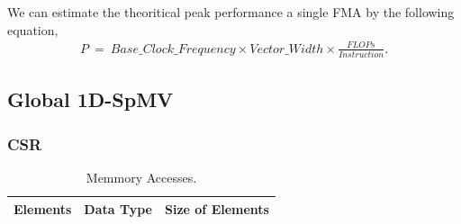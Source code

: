\documentclass[conference, 10ppt]{IEEEtran}
\begin{document}
We can estimate the theoritical peak performance a single FMA by the following equation,
\begin{eqnarray}
P\ =\ Base\_Clock\_Frequency\times Vector\_Width\times \frac{FLOPs}{Instruction}.
\end{eqnarray}

\subsection{Global 1D-SpMV}
\subsubsection{CSR}
\begin{table}[htb]
\caption{Memmory Accesses.}
\label{tab:g1d-csr-spmv-mem-access}
\centering
\begin{tabular}[c]{| l | c | c |}
\hline
Elements & Data Type & Size of Elements \\ \hline
\end{tabular}
\end{table}



\end{document}
